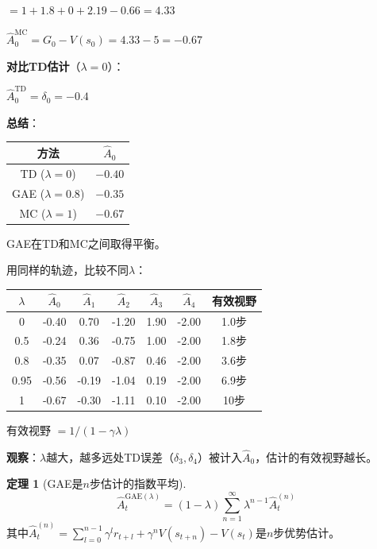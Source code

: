 \documentclass[11pt,a4paper]{article}
\theoremstyle{definition}
\newtheorem{theorem}{定理}[section]
\begin{document}
\begin{calculation}
$= 1 + 1.8 + 0 + 2.19 - 0.66 = 4.33$

$\hat{A}_0^{\text{MC}} = G_0 - V(s_0) = 4.33 - 5 = -0.67$

\textbf{对比TD估计}（$\lambda = 0$）：

$\hat{A}_0^{\text{TD}} = \delta_0 = -0.4$

\textbf{总结}：
\begin{center}
\begin{tabular}{c|c}
\toprule
方法 & $\hat{A}_0$ \\
\midrule
TD ($\lambda=0$) & $-0.40$ \\
GAE ($\lambda=0.8$) & $-0.35$ \\
MC ($\lambda=1$) & $-0.67$ \\
\bottomrule
\end{tabular}
\end{center}

GAE在TD和MC之间取得平衡。
\end{calculation}

\begin{calculation}
用同样的轨迹，比较不同$\lambda$：

\begin{center}
\begin{tabular}{c|ccccc|c}
\toprule
$\lambda$ & $\hat{A}_0$ & $\hat{A}_1$ & $\hat{A}_2$ & $\hat{A}_3$ & $\hat{A}_4$ & 有效视野 \\
\midrule
0 & -0.40 & 0.70 & -1.20 & 1.90 & -2.00 & 1.0步 \\
0.5 & -0.24 & 0.36 & -0.75 & 1.00 & -2.00 & 1.8步 \\
0.8 & -0.35 & 0.07 & -0.87 & 0.46 & -2.00 & 3.6步 \\
0.95 & -0.56 & -0.19 & -1.04 & 0.19 & -2.00 & 6.9步 \\
1 & -0.67 & -0.30 & -1.11 & 0.10 & -2.00 & 10步 \\
\bottomrule
\end{tabular}
\end{center}

有效视野 $= 1/(1-\gamma\lambda)$

\textbf{观察}：$\lambda$越大，越多远处TD误差（$\delta_3,\delta_4$）被计入$\hat{A}_0$，估计的有效视野越长。
\end{calculation}

\begin{theorem}[GAE是$n$步估计的指数平均]
\[
\hat{A}^{\text{GAE}(\lambda)}_t = (1-\lambda) \sum_{n=1}^\infty \lambda^{n-1} \hat{A}^{(n)}_t
\]
其中$\hat{A}^{(n)}_t = \sum_{l=0}^{n-1} \gamma^l r_{t+l} + \gamma^n V(s_{t+n}) - V(s_t)$是$n$步优势估计。
\end{theorem}
\end{document}
